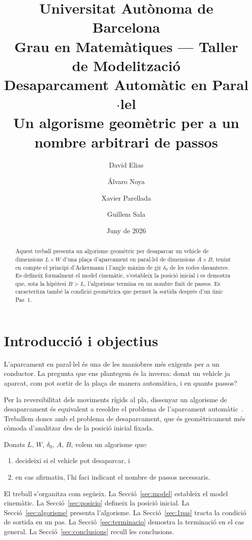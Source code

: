 \documentclass[11pt, a4paper]{article}
\title{%
  \large Universitat Aut\`onoma de Barcelona\\
  Grau en Matem\`atiques --- Taller de Modelitzaci\'o\\[1em]
  \LARGE\bfseries Desaparcament Autom\`atic en Paral$\cdot$lel\\[0.3em]
  \large Un algorisme geom\`etric per a un nombre arbitrari de passos
}
\author{David Elias \and \'Alvaro Noya \and Xavier Parellada \and Guillem Sala}
\date{Juny de 2026}
\theoremstyle{plain}
\theoremstyle{definition}
\begin{document}
\maketitle\thispagestyle{empty}

\begin{abstract}
Aquest treball presenta un algorisme geom\`etric per desaparcar un vehicle
de dimensions $L\times W$ d'una pla\c{c}a d'aparcament en paral$\cdot$lel de
dimensions $A\times B$, tenint en compte el principi d'Ackermann i l'angle
m\`axim de gir $\delta_0$ de les rodes davanteres. Es defineix formalment el
model cinem\`atic, s'estableix la posici\'o inicial i es demostra que, sota
la hip\`otesi $B>L$, l'algorisme termina en un nombre finit de passos.
Es caracteritza tamb\'e la condici\'o geom\`etrica que permet la sortida
despr\'es d'un \'unic Pas~1.
\end{abstract}

\tableofcontents\newpage

\section{Introducci\'o i objectius}

L'aparcament en paral$\cdot$lel \'es una de les maniobres m\'es exigents per
a un conductor. La pregunta que ens plantegem \'es la inversa: donat un vehicle
ja aparcat, com pot sortir de la pla\c{c}a de manera autom\`atica, i en quants
passos?

Per la reversibilitat dels moviments r\'igids al pla, dissenyar un algorisme
de desaparcament \'es equivalent a resoldre el problema de l'aparcament
autom\`atic~\cite{AA2023}. Treballem doncs amb el problema de desaparcament,
que \'es geom\`etricament m\'es c\`omoda d'analitzar des de la posici\'o
inicial fixada.

Donats $L$, $W$, $\delta_0$, $A$, $B$, volem un algorisme que:
\begin{enumerate}[noitemsep]
  \item decideixi si el vehicle pot desaparcar, i
  \item en cas afirmatiu, l'hi faci indicant el nombre de passos necessaris.
\end{enumerate}

El treball s'organitza com seg\"ueix. La Secci\'o~\ref{sec:model} estableix
el model cinem\`atic. La Secci\'o~\ref{sec:posicio} defineix la posici\'o
inicial. La Secci\'o~\ref{sec:algorisme} presenta l'algorisme. La
Secci\'o~\ref{sec:1pas} tracta la condici\'o de sortida en un pas. La
Secci\'o~\ref{sec:terminacio} demostra la terminaci\'o en el cas general.
La Secci\'o~\ref{sec:conclusions} recull les conclusions.
\end{document}
